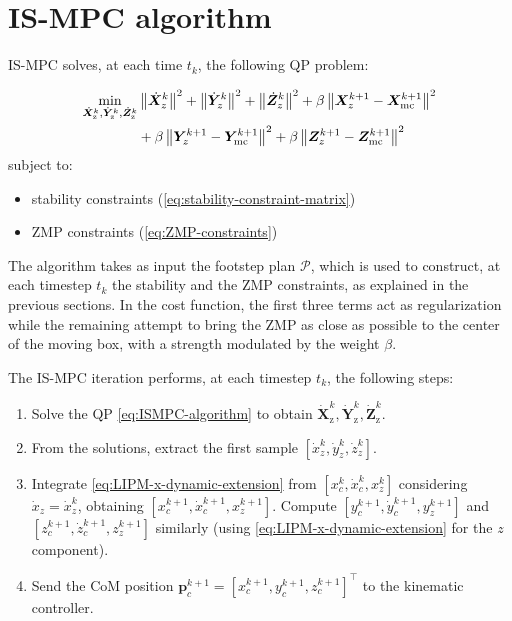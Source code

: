 \section{IS-MPC algorithm}
IS-MPC solves, at each time $t_k$, the following QP problem:
\begin{braced}
\begin{equation}
\begin{split}
\min_{\dot{\bm{X}}_\text{z}^k, \dot{\bm{Y}}_\text{z}^k, \dot{\bm{Z}}_\text{z}^k}
&\left\|\dot{\bm{X}}_z^k\right\|^2 + \left\|\dot{\bm{Y}}_z^k\right\|^2 + \left\|\dot{\bm{Z}}_z^k\right\|^2+\beta \left\|\bm{X}_z^{k+1} - {\bm{X}}_{\rm mc}^{k+1}\right\|^2 \\& + \beta \left\|\bm{Y}_z^{k+1} - {\bm{Y}}_{\rm mc}^{k+1}\right\|^2 + \beta \left\|\bm{Z}_z^{k+1} - {\bm{Z}}_{\rm mc}^{k+1}\right\|^2 \\
\end{split}
\label{eq:ISMPC-algorithm}
\end{equation}
\hspace{0.25cm} subject to:
\begin{itemize}
    \item stability constraints (\ref{eq:stability-constraint-matrix})
    \item ZMP constraints (\ref{eq:ZMP-constraints})
\end{itemize}
\end{braced}

The algorithm takes as input the footstep plan $\mathcal{P}$, which is used
to construct, at each timestep $t_k$ the stability and the ZMP constraints,
as explained in the previous sections.
In the cost function, the first three terms act as regularization while the
remaining attempt to bring the ZMP as close as possible to the center of the
moving box, with a strength modulated by the weight $\beta$.

The IS-MPC iteration performs, at each timestep $t_k$, the following steps:
\begin{enumerate}
    \item Solve the QP \eqref{eq:ISMPC-algorithm} to obtain 
        $\dot{\bm{X}}_\text{z}^k, \dot{\bm{Y}}_\text{z}^k, \dot{\bm{Z}}_\text{z}^k$.
    \item From the solutions, extract the first sample $\left[\dot x_z^k, \dot y_z^k, \dot z_z^k\right]$.
    \item Integrate \eqref{eq:LIPM-x-dynamic-extension} from
        $\left[x_c^k, \dot{x}_c^k, x_z^k\right]$ considering $\dot{x}_z=\dot{x}_z^k$, obtaining
        $\left[x_c^{k+1}, \dot{x}_c^{k+1}, x_z^{k+1}\right]$.
        Compute $\left[y_c^{k+1}, \dot{y}_c^{k+1}, y_z^{k+1}\right]$ and 
        $\left[z_c^{k+1}, \dot{z}_c^{k+1}, z_z^{k+1}\right]$ similarly (using
        \eqref{eq:LIPM-x-dynamic-extension} for the $z$ component).
    \item Send the CoM position $\bm{p}_c^{k+1}=\left[x_c^{k+1}, y_c^{k+1}, z_c^{k+1}\right]^\top$
        to the kinematic controller.
\end{enumerate}


